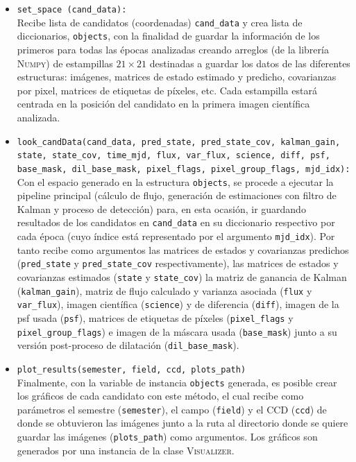 \begin{itemize}
\item \texttt{set\_space (cand\_data):}\\
Recibe lista de candidatos (coordenadas) \texttt{cand\_data} y crea lista de diccionarios, \texttt{objects}, con la finalidad de guardar la informaci\'on de los primeros para todas las \'epocas analizadas creando arreglos (de la librer\'ia \textsc{Numpy}) de estampillas $21 \times 21$ destinadas a guardar los datos de las diferentes estructuras: im\'agenes, matrices de estado estimado y predicho, covarianzas por pixel, matrices de etiquetas de p\'ixeles, etc. Cada estampilla estar\'a centrada en la posici\'on del candidato en la primera imagen cient\'ifica analizada. 
\bigskip

\item \texttt{look\_candData(cand\_data, pred\_state, pred\_state\_cov, kalman\_gain, state, state\_cov, time\_mjd, flux, var\_flux, science, diff, psf, base\_mask, dil\_base\_mask, pixel\_flags, pixel\_group\_flags, mjd\_idx):}\\
Con el espacio generado en la estructura \texttt{objects}, se procede a ejecutar la pipeline principal (c\'alculo de flujo, generaci\'on de estimaciones con filtro de Kalman y proceso de detecci\'on) para, en esta ocasi\'on, ir guardando resultados de los candidatos en \texttt{cand\_data} en su diccionario respectivo por cada \'epoca (cuyo \'indice est\'a representado por el argumento \texttt{mjd\_idx}). Por tanto recibe como argumentos las matrices de estados y covarianzas predichos (\texttt{pred\_state} y \texttt{pred\_state\_cov} respectivamente), las matrices de estados y covarianzas estimados (\texttt{state} y \texttt{state\_cov}) la matriz de ganancia de Kalman (\texttt{kalman\_gain}), matriz de flujo calculado y varianza asociada (\texttt{flux} y \texttt{var\_flux}), imagen cient\'ifica (\texttt{science}) y de diferencia (\texttt{diff}), imagen de la \gls{psf} usada (\texttt{psf}), matrices de etiquetas de p\'ixeles (\texttt{pixel\_flags} y \texttt{pixel\_group\_flags}) e imagen de la m\'ascara usada (\texttt{base\_mask}) junto a su versi\'on post-proceso de dilataci\'on (\texttt{dil\_base\_mask}).


\item \texttt{plot\_results(semester, field, ccd, plots\_path)}\\
Finalmente, con la variable de instancia \texttt{objects} generada, es posible crear los gr\'aficos de cada candidato con este m\'etodo, el cual recibe como par\'ametros el semestre (\texttt{semester}), el campo (\texttt{field}) y el CCD (\texttt{ccd}) de donde se obtuvieron las im\'agenes junto a la ruta al directorio donde se quiere guardar las im\'agenes (\texttt{plots\_path}) como argumentos. Los gr\'aficos son generados por una instancia de la clase \textsc{Visualizer}.
\end{itemize}

